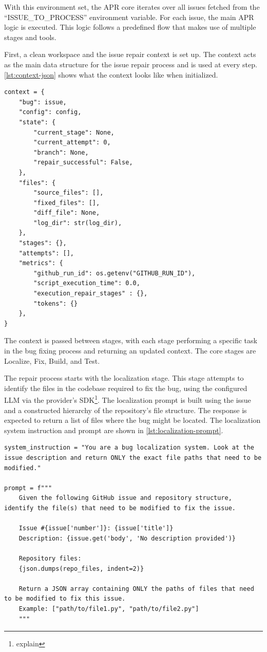 With this environment set, the APR core iterates over all issues fetched from the ``ISSUE\_TO\_PROCESS'' environment variable. For each issue, the main APR logic is executed. This logic follows a predefined flow that makes use of multiple stages and tools.

First, a clean workspace and the issue repair context is set up. The context acts as the main data structure for the issue repair process and is used at every step. \ref{lst:context-json} shows what the context looks like when initialized.

\begin{lstlisting}[style=json, caption={Context JSON}, label={lst:context-json}]  
context = {
    "bug": issue,
    "config": config,
    "state": {
        "current_stage": None,
        "current_attempt": 0,
        "branch": None,
        "repair_successful": False,
    },
    "files": {
        "source_files": [],
        "fixed_files": [],
        "diff_file": None,
        "log_dir": str(log_dir),
    },
    "stages": {},
    "attempts": [],
    "metrics": {
        "github_run_id": os.getenv("GITHUB_RUN_ID"),
        "script_execution_time": 0.0,
        "execution_repair_stages" : {},
        "tokens": {}
    },
}
\end{lstlisting}

The context is passed between stages, with each stage performing a specific task in the bug fixing process and returning an updated context. The core stages are Localize, Fix, Build, and Test.

The repair process starts with the localization stage. This stage attempts to identify the files in the codebase required to fix the bug, using the configured \ac{LLM} via the provider's SDK\footnote{explain}. The localization prompt is built using the issue and a constructed hierarchy of the repository's file structure. The response is expected to return a list of files where the bug might be located. The localization system instruction and prompt are shown in \ref{lst:localization-prompt}.

\begin{lstlisting}[style=python, caption={Localization Prompt}, label={lst:localization-prompt}]
system_instruction = "You are a bug localization system. Look at the issue description and return ONLY the exact file paths that need to be modified."

prompt = f"""
    Given the following GitHub issue and repository structure, identify the file(s) that need to be modified to fix the issue.

    Issue #{issue['number']}: {issue['title']}
    Description: {issue.get('body', 'No description provided')}

    Repository files:
    {json.dumps(repo_files, indent=2)}

    Return a JSON array containing ONLY the paths of files that need to be modified to fix this issue.
    Example: ["path/to/file1.py", "path/to/file2.py"]
    """
\end{lstlisting}

